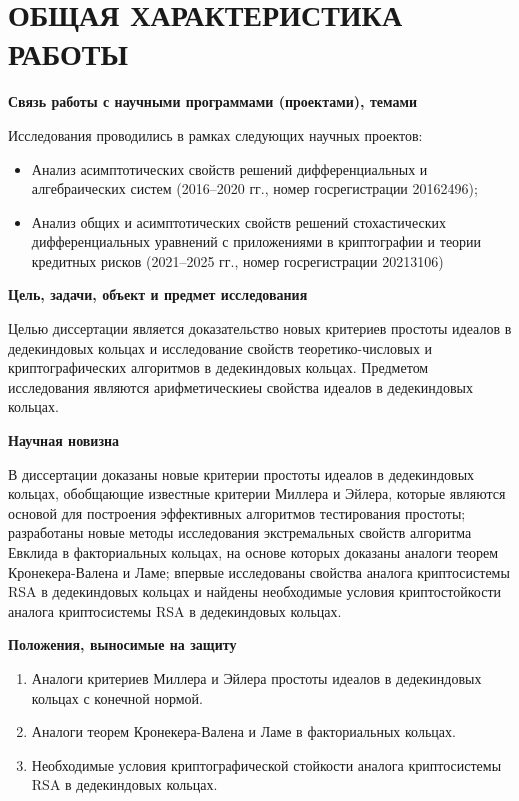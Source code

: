 \documentclass[_00_autoref.tex]{subfiles}
\begin{document}
{\let\clearpage\relax\vspace{2.2ex}
\chapter*{\MakeUppercase{ОБЩАЯ ХАРАКТЕРИСТИКА РАБОТЫ}}\vspace{-2ex}}

\medskip
\centerline{\textbf{Связь работы с научными программами (проектами), темами}}

Исследования проводились в рамках следующих научных проектов:
\begin{itemize}
    \item Анализ асимптотических свойств решений дифференциальных и алгебраических систем (2016--2020 гг., номер госрегистрации 20162496);

    \item Анализ общих и асимптотических свойств решений стохастических дифференциальных уравнений с приложениями в криптографии и теории кредитных рисков (2021--2025 гг., номер госрегистрации 20213106)
\end{itemize}

\pagebreak
\medskip
\centerline{\textbf{Цель, задачи, объект и предмет исследования}}

Целью диссертации является доказательство новых критериев простоты идеалов в дедекиндовых кольцах и исследование свойств теоретико-числовых и криптографических алгоритмов в дедекиндовых кольцах.
Предметом исследования являются арифметическиеы свойства идеалов в дедекиндовых кольцах.

\medskip
\centerline{\textbf{Научная новизна}}

В диссертации доказаны новые критерии простоты идеалов в дедекиндовых кольцах, обобщающие известные критерии Миллера и Эйлера, которые являются основой для построения эффективных алгоритмов тестирования простоты; разработаны новые методы исследования экстремальных свойств алгоритма Евклида в факториальных кольцах, на основе которых доказаны аналоги теорем Кронекера-Валена и Ламе; впервые исследованы свойства аналога криптосистемы RSA в дедекиндовых кольцах и найдены необходимые условия криптостойкости аналога криптосистемы RSA в дедекиндовых кольцах.

\medskip
\centerline{\textbf{Положения, выносимые на защиту}}

\begin{enumerate}
    \item Аналоги критериев Миллера и Эйлера простоты идеалов в дедекиндовых кольцах с конечной нормой.
    
    \item Аналоги теорем Кронекера-Валена и Ламе в факториальных кольцах.
    
    \item Необходимые условия криптографической стойкости аналога криптосистемы RSA в дедекиндовых кольцах.
\end{enumerate}
\end{document}
